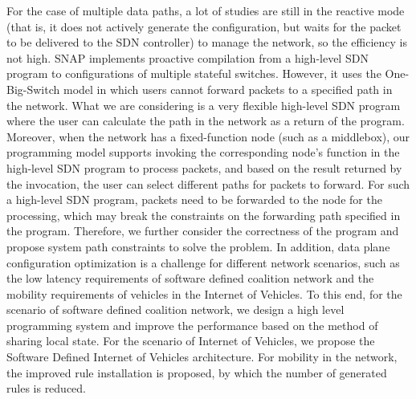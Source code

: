 \begin{eabstract}
For the case of multiple data paths, a lot of studies are still in the reactive mode (that is, it does not actively generate the configuration, but waits for the packet to be delivered to the SDN controller) to manage the network, so the efficiency is not high. SNAP implements proactive compilation from a high-level SDN program to configurations of multiple stateful switches. However, it uses the One-Big-Switch model in which users cannot forward packets to a specified path in the network. What we are considering is a very flexible high-level SDN program where the user can calculate the path in the network as a return of the program. Moreover, when the network has a fixed-function node (such as a middlebox), our programming model supports invoking the corresponding node's function in the high-level SDN program to process packets, and based on the result returned by the invocation, the user can select different paths for packets to forward. For such a high-level SDN program, packets need to be forwarded to the node for the processing, which may break the constraints on the forwarding path specified in the program. Therefore, we further consider the correctness of the program and propose system path constraints to solve the problem. In addition, data plane configuration optimization is a challenge for different network scenarios, such as the low latency requirements of software defined coalition network and the mobility requirements of vehicles in the Internet of Vehicles. To this end, for the scenario of software defined coalition network, we design a high level programming system and improve the performance based on the method of sharing local state. For the scenario of Internet of Vehicles, we propose the Software Defined Internet of Vehicles architecture. For mobility in the network, the improved rule installation is proposed, by which the number of generated rules is reduced.

\end{eabstract}

